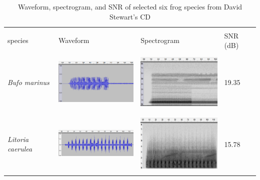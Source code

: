 
\begin{table}[htb!]
\centering
\caption[Waveform, spectrogram, and SNR of CD]{Waveform, spectrogram, and SNR of selected six frog species from David Stewart's CD}
\label{tab:wav_spec_cd}
\begin{tabular}{llll}
\hline\hline
\backslashbox{Frog \\ species}{}        & Waveform & Spectrogram & SNR (dB)   \\ \hline
\textit{Bufo marinus}        &   
\begin{minipage}{.3\textwidth} \includegraphics[width=45mm, height=30mm]{image/Ch1/toad_wave.png}  \end{minipage}    &   \begin{minipage}{.3\textwidth} \includegraphics[width=45mm, height=30mm]{image/Ch1/toad_spec.png}  \end{minipage}          & 19.35 \\ \hline
\textit{Litoria caerulea}    &  \begin{minipage}{.3\textwidth} \includegraphics[width=45mm, height=30mm]{image/Ch1/caerulea_wav.png}  \end{minipage}      &     \begin{minipage}{.3\textwidth} \includegraphics[width=45mm, height=30mm]{image/Ch1/caerulea_spec.png}   \end{minipage}     & 15.78 \\ \hline

\end{tabular}
\end{table}
